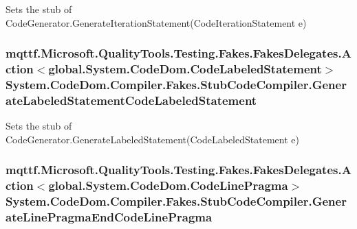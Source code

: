 Sets the stub of Code\-Generator.\-Generate\-Iteration\-Statement(\-Code\-Iteration\-Statement e)

\hypertarget{class_system_1_1_code_dom_1_1_compiler_1_1_fakes_1_1_stub_code_compiler_a7a80d177ee350f994ff756719b694c9f}{
\subsubsection[{Generate\-Labeled\-Statement\-Code\-Labeled\-Statement}]{\setlength{\rightskip}{0pt plus 5cm}mqttf.\-Microsoft.\-Quality\-Tools.\-Testing.\-Fakes.\-Fakes\-Delegates.\-Action$<$global.\-System.\-Code\-Dom.\-Code\-Labeled\-Statement$>$ System.\-Code\-Dom.\-Compiler.\-Fakes.\-Stub\-Code\-Compiler.\-Generate\-Labeled\-Statement\-Code\-Labeled\-Statement}}\label{class_system_1_1_code_dom_1_1_compiler_1_1_fakes_1_1_stub_code_compiler_a7a80d177ee350f994ff756719b694c9f}


Sets the stub of Code\-Generator.\-Generate\-Labeled\-Statement(\-Code\-Labeled\-Statement e)

\hypertarget{class_system_1_1_code_dom_1_1_compiler_1_1_fakes_1_1_stub_code_compiler_a9ee01e00f8b1e3655c7c87abdbeb3416}{
\subsubsection[{Generate\-Line\-Pragma\-End\-Code\-Line\-Pragma}]{\setlength{\rightskip}{0pt plus 5cm}mqttf.\-Microsoft.\-Quality\-Tools.\-Testing.\-Fakes.\-Fakes\-Delegates.\-Action$<$global.\-System.\-Code\-Dom.\-Code\-Line\-Pragma$>$ System.\-Code\-Dom.\-Compiler.\-Fakes.\-Stub\-Code\-Compiler.\-Generate\-Line\-Pragma\-End\-Code\-Line\-Pragma}}\label{class_system_1_1_code_dom_1_1_compiler_1_1_fakes_1_1_stub_code_compiler_a9ee01e00f8b1e3655c7c87abdbeb3416}


